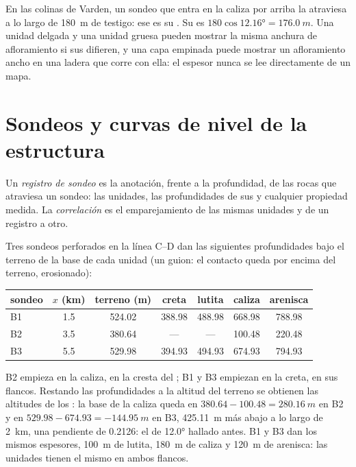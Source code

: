 En las colinas de Varden, un sondeo que entra en la caliza por arriba la atraviesa a lo largo de \qty{180}{m} de testigo:
ese es su . Su  es $180\cos\ang{12.16} = \qty{176.0}{m}$. Una
unidad delgada y una unidad gruesa pueden mostrar la misma anchura de afloramiento si sus
 difieren, y una capa empinada puede mostrar un afloramiento ancho en una ladera que
corre con ella: el espesor nunca se lee directamente de un mapa.

\section{Sondeos y curvas de nivel de la estructura}\label{sec:b1:cross-sections:boreholes}

\begin{definition}\label{def:b1:cross-sections:log}
Un \emph{registro de sondeo} es la anotación, frente a la profundidad, de
las rocas que atraviesa un sondeo: las unidades, las profundidades de sus  y cualquier
propiedad medida. La \emph{correlación} es el emparejamiento de
las mismas unidades y  de un registro a otro.
\end{definition}

Tres sondeos perforados en la línea C--D dan las siguientes profundidades bajo el terreno de la base
de cada unidad (un guion: el contacto queda por encima del terreno, erosionado):
\begin{center}
\small
\begin{tabular}{lcccccc}
\hline
sondeo & $x$ (km) & terreno (m) & creta & lutita & caliza & arenisca \\
\hline
B1 & 1.5 & 524.02 & 388.98 & 488.98 & 668.98 & 788.98 \\
B2 & 3.5 & 380.64 & --- & --- & 100.48 & 220.48 \\
B3 & 5.5 & 529.98 & 394.93 & 494.93 & 674.93 & 794.93 \\
\hline
\end{tabular}
\end{center}
B2 empieza en la caliza, en la cresta del ; B1 y B3 empiezan en la creta, en sus flancos.
Restando las profundidades a la altitud del terreno se obtienen las altitudes de los : la
base de la caliza queda en $380.64 - 100.48 = \qty{280.16}{m}$ en B2 y en $529.98 - 674.93 =
\qty{-144.95}{m}$ en B3, \qty{425.11}{m} más abajo a lo largo de \qty{2}{km}, una pendiente de
\num{0.2126}: el  de \ang{12.0} hallado antes. B1 y B3 dan los mismos
espesores, \qty{100}{m} de lutita, \qty{180}{m} de caliza y \qty{120}{m} de arenisca: las unidades
tienen el mismo  en ambos flancos.

